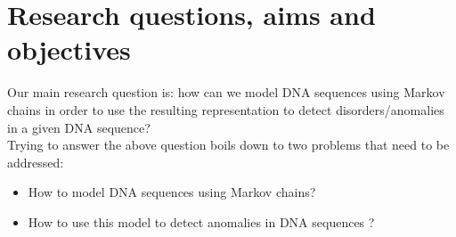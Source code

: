 \documentclass[10pt,twocolumn,letterpaper]{article}
\begin{document}
\section{Research questions, aims and objectives}
 {
    Our main research question is: how can we model DNA sequences using Markov chains in order 
    to use the resulting representation to detect disorders/anomalies in a given DNA sequence?\\
    Trying to answer the above question boils down to two problems that need to be addressed:
    \begin{itemize}
        \item How to model DNA sequences using Markov chains?
        \item How to use this model to detect anomalies in DNA sequences \cite{scientific_american}?
    \end{itemize}

 }
\end{document}
